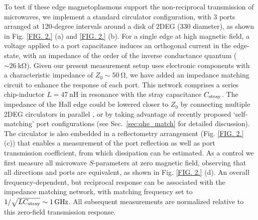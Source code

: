 To test if these edge magnetoplasmons support the non-reciprocal transmission of microwaves, we implement a standard circulator configuration, with 3 ports arranged at 120-degree intervals around a disk of 2DEG (\SI{330}{\micron} diameter), as shown in Fig. \ref{FIG. 2.} (a) and \ref{FIG. 2.} (b). For a single edge at high magnetic field, a voltage applied to a port capacitance induces an orthogonal current in the edge-state, with an impedance of the order of the inverse conductance quantum ($\sim \SI{26}{\kilo\ohm}$). Given our present measurement setup uses electronic components with a characteristic impedance of $Z_0 \sim \SI{50}{\ohm}$, we have added an impedance matching circuit to enhance the response of each port. This network comprises a series chip-inductor $L = \SI{47}{\nano\henry}$ in resonance with the stray capacitance $C_{\rm stray}$. The impedance of the Hall edge could be lowered closer to $Z_0$ by connecting multiple 2DEG circulators in parallel \cite{druist1998observation}, or by taking advantage of recently proposed `self-matching' port configurations \cite{bosco2016self,placke2016model} (see Sec.~\ref{sec:qhe_match} for detailed discussion). The circulator is also embedded in a reflectometry arrangement (Fig. \ref{FIG. 2.} (c)) that enables a measurement of the port reflection as well as port transmission coefficient, from which dissipation can be estimated. As a control we first measure all microwave $S$-parameters at zero magnetic field, observing that all directions and ports are equivalent, as shown in Fig. \ref{FIG. 2.} (d).  An overall frequency-dependent, but reciprocal response can be associated with the impedance matching network, with matching frequency set to $1/\sqrt{LC_{\rm stray}} \sim \SI{1}{\giga\hertz}$.  All subsequent measurements are normalized relative to this zero-field transmission response.

